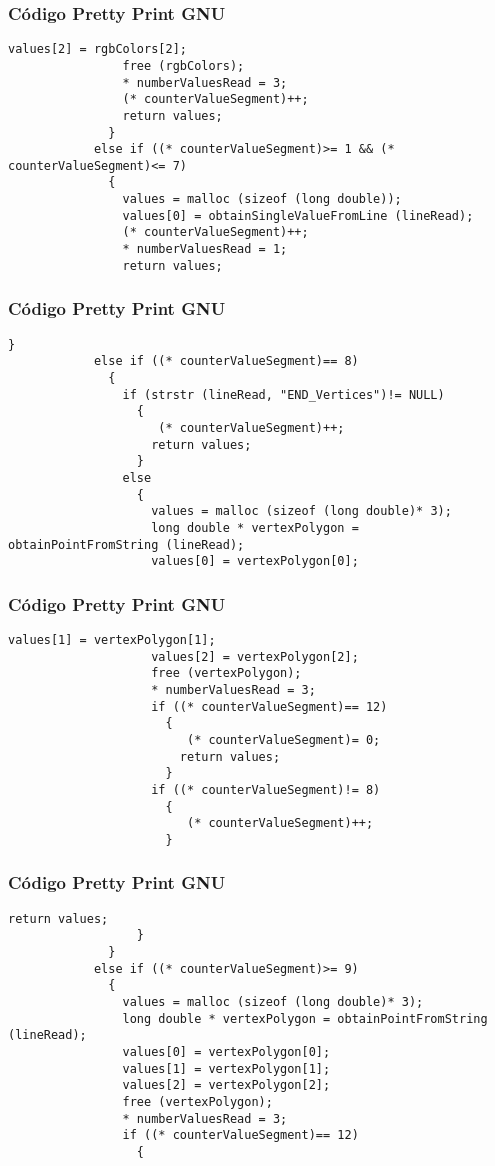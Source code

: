 \documentclass{beamer}
\begin{document}
\begin{frame}[fragile]
\frametitle{C\'odigo Pretty Print GNU}
\begin{lstlisting}[style=CStyle]
                values[2] = rgbColors[2];
                free (rgbColors);
                * numberValuesRead = 3;
                (* counterValueSegment)++;
                return values;
              }
            else if ((* counterValueSegment)>= 1 && (* counterValueSegment)<= 7)
              {
                values = malloc (sizeof (long double));
                values[0] = obtainSingleValueFromLine (lineRead);
                (* counterValueSegment)++;
                * numberValuesRead = 1;
                return values;
\end{lstlisting}
\end{frame}
\begin{frame}[fragile]
\frametitle{C\'odigo Pretty Print GNU}
\begin{lstlisting}[style=CStyle]
              }
            else if ((* counterValueSegment)== 8)
              {
                if (strstr (lineRead, "END_Vertices")!= NULL)
                  {
                     (* counterValueSegment)++;
                    return values;
                  }
                else
                  {
                    values = malloc (sizeof (long double)* 3);
                    long double * vertexPolygon = obtainPointFromString (lineRead);
                    values[0] = vertexPolygon[0];
\end{lstlisting}
\end{frame}
\begin{frame}[fragile]
\frametitle{C\'odigo Pretty Print GNU}
\begin{lstlisting}[style=CStyle]
                    values[1] = vertexPolygon[1];
                    values[2] = vertexPolygon[2];
                    free (vertexPolygon);
                    * numberValuesRead = 3;
                    if ((* counterValueSegment)== 12)
                      {
                         (* counterValueSegment)= 0;
                        return values;
                      }
                    if ((* counterValueSegment)!= 8)
                      {
                         (* counterValueSegment)++;
                      }
\end{lstlisting}
\end{frame}
\begin{frame}[fragile]
\frametitle{C\'odigo Pretty Print GNU}
\begin{lstlisting}[style=CStyle]
                    return values;
                  }
              }
            else if ((* counterValueSegment)>= 9)
              {
                values = malloc (sizeof (long double)* 3);
                long double * vertexPolygon = obtainPointFromString (lineRead);
                values[0] = vertexPolygon[0];
                values[1] = vertexPolygon[1];
                values[2] = vertexPolygon[2];
                free (vertexPolygon);
                * numberValuesRead = 3;
                if ((* counterValueSegment)== 12)
                  {
                    \end{lstlisting}
\end{frame}
\end{document}
